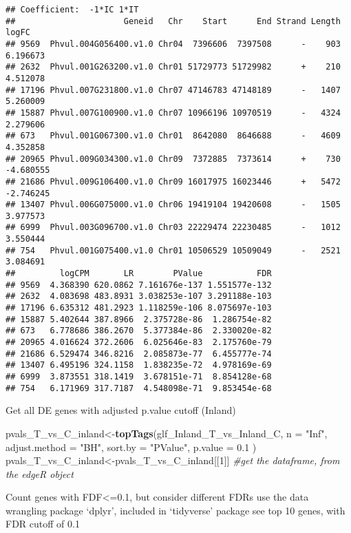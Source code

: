 \documentclass[
]{article}
\newenvironment{Shaded}{\begin{snugshade}}{\end{snugshade}}
\newcommand{\CommentTok}[1]{\textcolor[rgb]{0.56,0.35,0.01}{\textit{#1}}}
\newcommand{\DataTypeTok}[1]{\textcolor[rgb]{0.13,0.29,0.53}{#1}}
\newcommand{\DecValTok}[1]{\textcolor[rgb]{0.00,0.00,0.81}{#1}}
\newcommand{\FloatTok}[1]{\textcolor[rgb]{0.00,0.00,0.81}{#1}}
\newcommand{\KeywordTok}[1]{\textcolor[rgb]{0.13,0.29,0.53}{\textbf{#1}}}
\newcommand{\NormalTok}[1]{#1}
\newcommand{\StringTok}[1]{\textcolor[rgb]{0.31,0.60,0.02}{#1}}
\begin{document}
\begin{verbatim}
## Coefficient:  -1*IC 1*IT 
##                      Geneid   Chr    Start      End Strand Length     logFC
## 9569  Phvul.004G056400.v1.0 Chr04  7396606  7397508      -    903  6.196673
## 2632  Phvul.001G263200.v1.0 Chr01 51729773 51729982      +    210  4.512078
## 17196 Phvul.007G231800.v1.0 Chr07 47146783 47148189      -   1407  5.260009
## 15887 Phvul.007G100900.v1.0 Chr07 10966196 10970519      -   4324  2.279606
## 673   Phvul.001G067300.v1.0 Chr01  8642080  8646688      -   4609  4.352858
## 20965 Phvul.009G034300.v1.0 Chr09  7372885  7373614      +    730 -4.680555
## 21686 Phvul.009G106400.v1.0 Chr09 16017975 16023446      +   5472 -2.746245
## 13407 Phvul.006G075000.v1.0 Chr06 19419104 19420608      -   1505  3.977573
## 6999  Phvul.003G096700.v1.0 Chr03 22229474 22230485      -   1012  3.550444
## 754   Phvul.001G075400.v1.0 Chr01 10506529 10509049      -   2521  3.084691
##         logCPM       LR        PValue           FDR
## 9569  4.368390 620.0862 7.161676e-137 1.551577e-132
## 2632  4.083698 483.8931 3.038253e-107 3.291188e-103
## 17196 6.635312 481.2923 1.118259e-106 8.075697e-103
## 15887 5.402644 387.8966  2.375728e-86  1.286754e-82
## 673   6.778686 386.2670  5.377384e-86  2.330020e-82
## 20965 4.016624 372.2606  6.025646e-83  2.175760e-79
## 21686 6.529474 346.8216  2.085873e-77  6.455777e-74
## 13407 6.495196 324.1158  1.838235e-72  4.978169e-69
## 6999  3.873551 318.1419  3.678151e-71  8.854128e-68
## 754   6.171969 317.7187  4.548098e-71  9.853454e-68
\end{verbatim}

Get all DE genes with adjusted p.value cutoff (Inland)

\begin{Shaded}
\begin{Highlighting}[]
\NormalTok{pvals_T_vs_C_inland<-}\KeywordTok{topTags}\NormalTok{(glf_Inland_T_vs_Inland_C, }\DataTypeTok{n =} \StringTok{"Inf"}\NormalTok{, }\DataTypeTok{adjust.method =} \StringTok{"BH"}\NormalTok{, }\DataTypeTok{sort.by =} \StringTok{"PValue"}\NormalTok{, }\DataTypeTok{p.value =} \FloatTok{0.1}\NormalTok{ )}
\NormalTok{pvals_T_vs_C_inland<-pvals_T_vs_C_inland[[}\DecValTok{1}\NormalTok{]] }\CommentTok{#get the dataframe, from the edgeR object}
\end{Highlighting}
\end{Shaded}

Count genes with FDF\textless=0.1, but consider different FDRs use the
data wrangling package `dplyr', included in `tidyverse' package see top
10 genes, with FDR cutoff of 0.1
\end{document}
